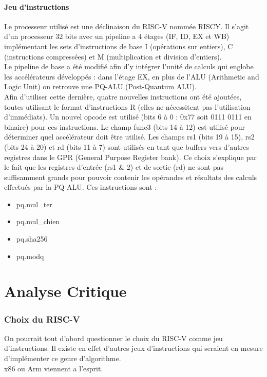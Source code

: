 \documentclass[10pt,a4paper]{article}
\begin{document}
\subsection{Jeu d'instructions}
Le processeur utilisé est une déclinaison du RISC-V nommée RISCY. Il s'agit d'un processeur 32 bits avec un pipeline a 4 étages (IF, ID, EX et WB) implémentant les sets d'instructions de base
I (opérations sur entiers), C (instructions compressées) et M (multiplication et division d'entiers).\\
Le pipeline de base a été modifié afin d'y intégrer l'unité de calculs qui englobe les accélérateurs développés : dans l'étage EX, en plus de l'ALU (Arithmetic and Logic Unit) on retrouve une 
PQ-ALU (Post-Quantum ALU). \\ 
Afin d'utiliser cette dernière, quatre nouvelles instructions ont été ajoutées, toutes utilisant le format d'instructions R (elles ne nécessitent pas l'utilisation d'immédiats). Un nouvel opcode 
est utilisé (bits 6 à 0 : 0x77 soit 0111 0111 en binaire) pour ces instructions. Le champ func3 (bits 14 à 12) est utilisé pour déterminer quel accélérateur doit être utilisé. Les champs rs1 (bits 
19 à 15), rs2 (bits 24 à 20) et rd (bits 11 à 7) sont utilisés en tant que buffers vers d'autres registres dans le GPR (General Purpose Register bank). Ce choix s'explique par le fait que les registres 
d'entrée (rs1 \& 2) et de sortie (rd) ne sont pas suffisamment grands pour pouvoir contenir les opérandes et résultats des calculs effectués par la PQ-ALU. Ces instructions sont :\\
\begin{itemize}
    \item pq.mul\_ter
    \item pq.mul\_chien 
    \item pq.sha256 
    \item pq.modq
\end{itemize}
\newpage
\part{Analyse Critique}

\section{Choix du RISC-V}

On pourrait tout d'abord questionner le choix du RISC-V comme jeu d'instructions. Il existe en effet d'autres jeux d'instructions qui seraient en mesure d'implémenter ce genre d'algorithme.\\
x86 ou Arm viennent a l'esprit. 
\end{document}
